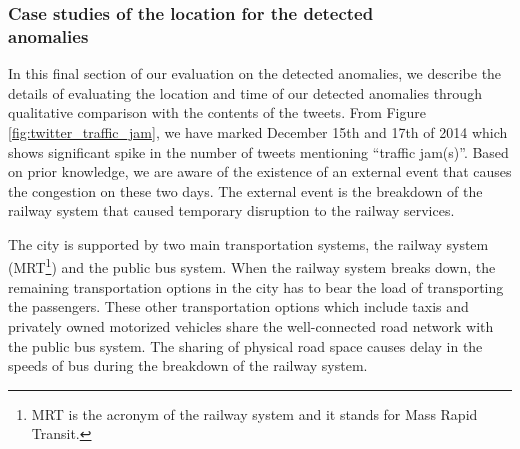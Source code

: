 \documentclass[conference]{IEEEtran.1.8}
\begin{document}
\subsubsection{Case studies of the location for the detected\\anomalies}

In this final section of our evaluation on the detected anomalies, we describe the details of evaluating the location and time of our detected anomalies through qualitative comparison with the contents of the tweets. From Figure \ref{fig:twitter_traffic_jam}, we have marked December 15th and 17th of 2014 which shows significant spike in the number of tweets mentioning ``traffic jam(s)''. Based on prior knowledge, we are aware of the existence of an external event that causes the congestion on these two days. The external event is the breakdown of the railway system that caused temporary disruption to the railway services.

The city is supported by two main transportation systems, the railway system (MRT\footnote{MRT is the acronym of the railway system and it stands for Mass Rapid Transit.}) and the public bus system. When the railway system breaks down, the remaining transportation options in the city has to bear the load of transporting the passengers. These other transportation options which include taxis and privately owned motorized vehicles share the well-connected road network with the public bus system. The sharing of physical road space causes delay in the speeds of bus during the breakdown of the railway system. 
\end{document}
